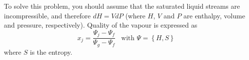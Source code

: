 \documentclass[calculator,steamtables,allquestions,datasheet]{exam_newMarcus2}
\newcommand{\frc}{\displaystyle\frac}
\begin{document}
\begin{question}
\begin{enumerate}[(a)]
\end{enumerate}
To solve this problem, you should assume that the saturated liquid streams are incompressible, and therefore $dH = VdP$ (where $H$, $V$ and $P$ are enthalpy, volume and pressure, respectively). Quality of the vapour is expressed as
\begin{displaymath}
x_{j} = \frc{\Psi_{j}-\Psi_{f}}{\Psi_{g}-\Psi_{f}}\;\;\;\text{with }\Psi=\left\{H,S\right\}
\end{displaymath}
where $S$ is the entropy. 

\end{question}
\clearpage
\end{document}
